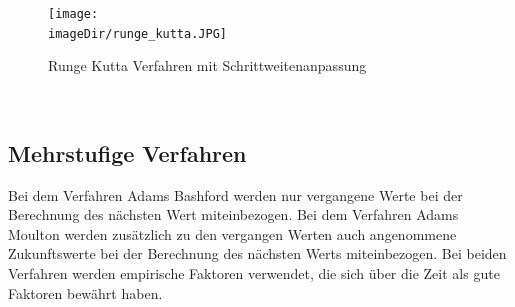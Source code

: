 \documentclass[11pt, a4paper, twoside]{article}   	%
\newcommand{\imageDir}{./images/}
\begin{document}
\begin{figure}[h]
\centering
\texttt{[image: \\imageDir/runge\_kutta.JPG]}
\caption{Runge Kutta Verfahren mit Schrittweitenanpassung}
\label{fig:euler-integration}
\end{figure}
\ \newpage

\subsection{Mehrstufige Verfahren}
Bei dem Verfahren Adams Bashford werden nur vergangene Werte bei der Berechnung des nächsten Wert miteinbezogen. Bei dem Verfahren Adams Moulton werden zusätzlich zu den vergangen Werten auch angenommene Zukunftswerte bei der Berechnung des nächsten Werts miteinbezogen. Bei beiden Verfahren werden empirische Faktoren verwendet, die sich über die Zeit als gute Faktoren bewährt haben.
\end{document}
